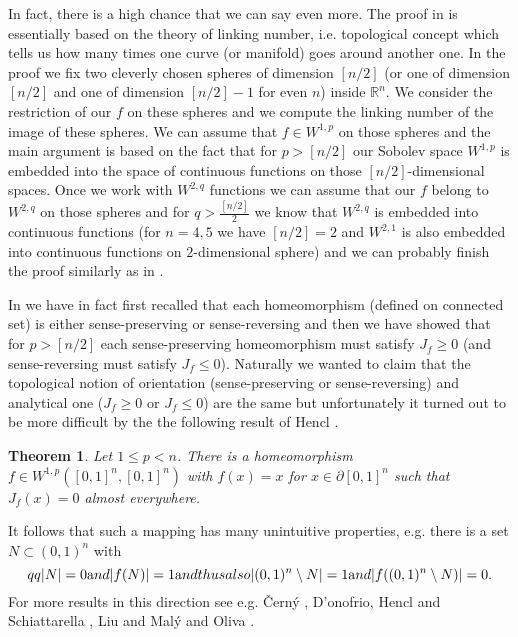 \documentclass[12pt,a4paper]{amsart}
\theoremstyle{plain}
\newtheorem{thm}{Theorem}[section]
\theoremstyle{definition}
\def\eqn#1$$#2$${\begin{equation}\label#1#2\end{equation}}
\numberwithin{equation}{section}
\def\er{\mathbb R}
\def\rn{\mathbb R^n}
\begin{document}
In fact, there is a high chance that we can say even more. The proof in \cite{HM} is essentially based on the theory of linking number, i.e. topological concept which tells us how many times one curve (or manifold) goes around another one. In the proof we fix two cleverly chosen spheres of dimension $[n/2]$ (or one of dimension $[n/2]$ and one of dimension $[n/2]-1$ for even $n$) inside $\rn$. We consider the restriction of our $f$ on these spheres and we compute the linking number of the image of these spheres. We can assume that $f\in W^{1,p}$ on those spheres and the main argument is based on the fact that for $p>[n/2]$ our Sobolev space $W^{1,p}$ is embedded into the space of continuous functions on those $[n/2]$-dimensional spaces. Once we work with $W^{2,q}$ functions we can assume that our $f$ belong to $W^{2,q}$ on those spheres and for $q>\frac{[n/2]}{2}$ we know that $W^{2,q}$ is embedded into continuous functions (for $n=4,5$ we have $[n/2]=2$ and $W^{2,1}$ is also embedded into continuous functions on $2$-dimensional sphere) and we can probably finish the proof similarly as in \cite{HM}. 
 


\vskip 10pt

In \cite{HM} we have in fact first recalled that each homeomorphism (defined on connected set) is either sense-preserving or sense-reversing and then we have showed that for $p>[n/2]$ each sense-preserving homeomorphism must satisfy $J_f\geq 0$ (and sense-reversing must satisfy $J_f\leq 0$). Naturally we wanted to claim that the topological notion of orientation (sense-preserving or sense-reversing) and analytical one ($J_f\geq 0$ or $J_f\leq 0$) are the same but unfortunately it turned out to be more difficult by the the following result of Hencl \cite{H}. 

\begin{thm}\label{jaczero}
Let $1\leq p<n$. There is a homeomorphism $f\in W^{1,p}([0,1]^n,[0,1]^n)$ with $f(x)=x$ for $x\in\partial [0,1]^n$ such that $J_f(x)=0$ almost everywhere. 
\end{thm}

It follows that such a mapping has many unintuitive properties, e.g. there is a set $N\subset (0,1)^n$ with
\eqn{qqq}
$$
|N|=0\text{ and }|f(N)|=1\text{ and thus also }|(0,1)^n\setminus N|=1\text{ and }|f((0,1)^n\setminus N)|=0. 
$$
For more results in this direction see e.g. \v{C}ern\'y \cite{C}, D'onofrio, Hencl and Schiattarella \cite{DHS}, Liu and Mal\'y \cite{LM}  and Oliva \cite{O}.
\end{document}
